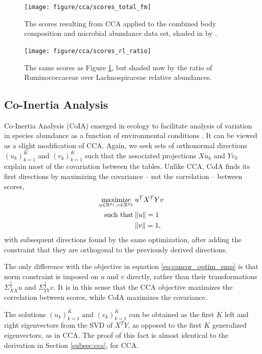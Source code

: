 \documentclass[14pt]{extarticle}
\begin{document}
\begin{figure}
  \centering
  \texttt{[image: figure/cca/scores\_total\_fm]}
  \caption{The scores resulting from CCA applied to the combined body
    composition and microbial abundance data set, shaded in by
    .\label{fig:cca_scores_total_fm} }
\end{figure}

\begin{figure}
  \centering
  \texttt{[image: figure/cca/scores\_rl\_ratio]}
  \caption{The same scores as Figure \ref{fig:cca_scores_total_fm}, but shaded now by
    the ratio of Ruminococcaceae over Lachnospiraceae relative
    abundances. \label{fig:cca_scores_rl_ratio} }
\end{figure}

\subsection{Co-Inertia Analysis}

Co-Inertia Analysis (CoIA) emerged in ecology to facilitate analysis of
variation in species abundance as a function of environmental conditions
\citep{doledec1994co}. It can be viewed as a slight modification of CCA. Again,
we seek sets of orthonormal directions $\left(u_{k}\right)_{k = 1}^{K}$ and
$\left(v_{k}\right)_{k = 1}^{K}$ such that the associated projections $Xu_{k}$
and $Yv_{k}$ explain most of the covariation between the tables. Unlike CCA,
CoIA finds its first directions by maximizing the covariance -- not the
correlation -- between scores,
\begin{align*}
\mathop\mathrm{maximize}_{u \in \mathbb{R}^{p_{1}}, v \in \mathbb{R}^{p_{2}}}\medspace &u^{T}X^{T}Yv \\
\text{ such that}\medspace &\|u\| = 1\\
&\|v\| = 1,
\end{align*}
with subsequent directions found by the same optimization, after adding the
constraint that they are orthogonal to the previously derived directions.

The only difference with the objective in equation \ref{eq:cancor_optim_emp} is
that norm constraint is imposed on $u$ and $v$ directly, rather than their
transformations $\Sigma_{XX}^{\frac{1}{2}}u$ and $\Sigma_{YY}^{\frac{1}{2}}v$.
It is in this sense that the CCA objective maximizes the correlation between
scores, while CoIA maximizes the covariance.

The solutions $\left(u_{k}\right)_{k = 1}^{K}$ and $\left(v_{k}\right)_{k =
  1}^{K}$ can be obtained as the first $K$ left and right eigenvectors from the
SVD of $X^{T}Y$, as opposed to the first $K$ generalized eigenvectors, as in
CCA. The proof of this fact is almost identical to the derivation in Section
\ref{subsec:cca}, for CCA.
\end{document}
